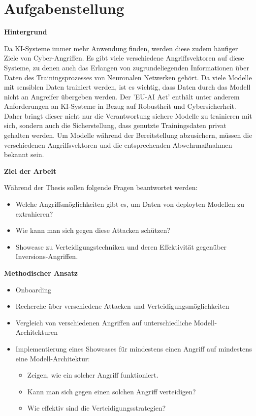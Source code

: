 \section{Aufgabenstellung} \label{chpt:Einleitung_Aufgabenstellung}

\textbf{Hintergrund}

Da KI-Systeme immer mehr Anwendung finden, werden diese zudem häufiger Ziele von Cyber-Angriffen. Es gibt viele verschiedene Angriffsvektoren auf diese Systeme, zu denen auch das Erlangen von zugrundeliegenden Informationen über Daten des Trainingsprozesses von Neuronalen Netwerken gehört. Da viele Modelle mit sensiblen Daten trainiert werden, ist es wichtig, dass Daten durch das Modell nicht an Angreifer übergeben werden.
Der 'EU-AI Act' enthält unter anderem Anforderungen an KI-Systeme in Bezug auf Robustheit und Cybersicherheit. Daher bringt dieser nicht nur die Verantwortung sichere Modelle zu trainieren mit sich, sondern auch die Sicherstellung, dass genutzte Trainingsdaten privat gehalten werden. Um Modelle während der Bereitstellung abzusichern, müssen die verschiedenen Angriffsvektoren und die entsprechenden Abwehrmaßnahmen bekannt sein.
\newline

\textbf{Ziel der Arbeit} 

Während der Thesis sollen folgende Fragen beantwortet werden:
\begin{itemize}
	\item Welche Angriffsmöglichkeiten gibt es, um Daten von deployten Modellen zu extrahieren?
	\item Wie kann man sich gegen diese Attacken schützen?
	\item Showcase zu Verteidigungstechniken und deren Effektivität gegenüber Inversions-Angriffen. \newline
\end{itemize}

\textbf{Methodischer Ansatz}

\begin{itemize}
	\item Onboarding
	\item Recherche über verschiedene Attacken und Verteidigungsmöglichkeiten
	\item Vergleich von verschiedenen Angriffen auf unterschiedliche Modell-Architekturen
	\item Implementierung eines Showcases für mindestens einen Angriff auf mindestens eine Modell-Architektur:
		\begin{itemize}
			\item Zeigen, wie ein solcher Angriff funktioniert.
			\item Kann man sich gegen einen solchen Angriff verteidigen?
			\item Wie effektiv sind die Verteidigungsstrategien? \newline
		\end{itemize}
\end{itemize}


